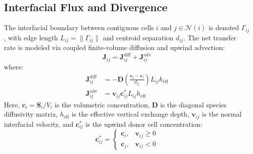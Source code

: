\documentclass[10pt,journal,compsoc]{IEEEtran}
\begin{document}
\subsection{Interfacial Flux and Divergence}
The interfacial boundary between contiguous cells $i$ and $j \in \mathcal{N}(i)$ is denoted $\Gamma_{ij}$, with edge length $L_{ij} = \|\Gamma_{ij}\|$ and centroid separation $d_{ij}$. The net transfer rate is modeled via coupled finite-volume diffusion and upwind advection:
\begin{equation}
\mathbf{J}_{ij} = \mathbf{J}_{ij}^{\mathrm{diff}} + \mathbf{J}_{ij}^{\mathrm{adv}}
\end{equation}
where:
\begin{align}
\mathbf{J}_{ij}^{\mathrm{diff}} &= - \mathbf{D} \left( \frac{\mathbf{c}_j - \mathbf{c}_i}{d_{ij}} \right) L_{ij} h_{\mathrm{eff}} \\
\mathbf{J}_{ij}^{\mathrm{adv}} &= \mathbf{v}_{ij} \mathbf{c}_{ij}^{\ast} L_{ij} h_{\mathrm{eff}}
\end{align}
Here, $\mathbf{c}_i = \mathbf{S}_i / V_i$ is the volumetric concentration, $\mathbf{D}$ is the diagonal species diffusivity matrix, $h_{\mathrm{eff}}$ is the effective vertical exchange depth, $\mathbf{v}_{ij}$ is the normal interfacial velocity, and $\mathbf{c}_{ij}^{\ast}$ is the upwind donor cell concentration:
\begin{equation}
\mathbf{c}_{ij}^{\ast} = \begin{cases} \mathbf{c}_i, & \mathbf{v}_{ij} \ge 0 \\ \mathbf{c}_j, & \mathbf{v}_{ij} < 0 \end{cases}
\end{equation}
\end{document}
